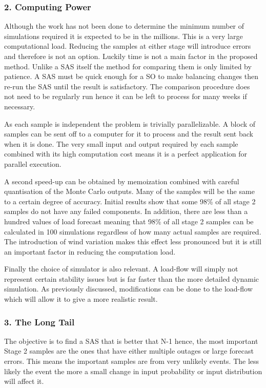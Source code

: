 \documentclass[a4paper,oneside,12pt]{report}
\begin{document}
\subsubsection{2. Computing Power}

Although the work has not been done to determine the minimum number of simulations required it is expected to be in the millions. This is a very large computational load. Reducing the samples at either stage will introduce errors and therefore is not an option. Luckily time is not a main factor in the proposed method. Unlike a SAS itself the method for comparing them is only limited by patience. A SAS must be quick enough for a SO to make balancing changes then re-run the SAS until the result is satisfactory. The comparison procedure does not need to be regularly run hence it can be left to process for many weeks if necessary.

As each sample is independent the problem is trivially parallelizable. A block of samples can be sent off to a computer for it to process and the result sent back when it is done. The very small input and output required by each sample combined with its high computation cost means it is a perfect application for parallel execution.

A second speed-up can be obtained by memoization combined with careful quantisation of the Monte Carlo outputs. Many of the samples will be the same to a certain degree of accuracy. Initial results show that some 98\% of all stage 2 samples do not have any failed components. In addition, there are less than a hundred values of load forecast meaning that 98\% of all stage 2 samples can be calculated in 100 simulations regardless of how many actual samples are required. The introduction of wind variation makes this effect less pronounced but it is still an important factor in reducing the computation load.

Finally the choice of simulator is also relevant. A load-flow will simply not represent certain stability issues but is far faster than the more detailed dynamic simulation. As previously discussed, modifications can be done to the load-flow which will allow it to give a more realistic result.

\subsubsection{3. The Long Tail}

The objective is to find a SAS that is better that N-1 hence, the most important Stage 2 samples are the ones that have either multiple outages or large forecast errors. This means the important samples are from very unlikely events. The less likely the event the more a small change in input probability or input distribution will affect it.
\end{document}
